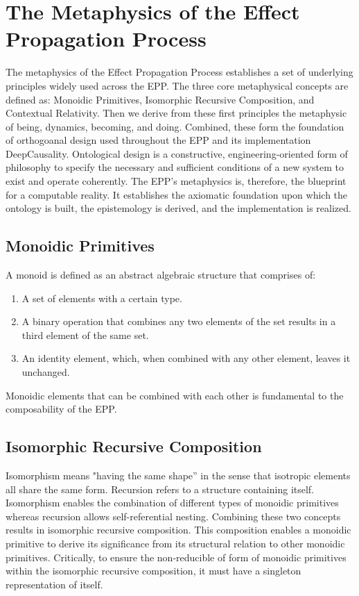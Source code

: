 \section{The Metaphysics of the Effect Propagation Process}
\label{sec:metaphysics}

The metaphysics of the Effect Propagation Process establishes a set of underlying principles widely used across the EPP. The three core metaphysical concepts are defined as: Monoidic Primitives, Isomorphic Recursive Composition, and Contextual Relativity. Then we derive from these first principles the metaphysic of being, dynamics, becoming, and doing. Combined, these form the foundation of orthogoanal design used throughout the EPP and its implementation DeepCausality. Ontological design is a constructive, engineering-oriented form of philosophy to specify the necessary and sufficient conditions of a new system to exist and operate coherently. The EPP's metaphysics is, therefore, the blueprint for a computable reality. It establishes the axiomatic foundation upon which the ontology is built, the epistemology is derived, and the implementation is realized. 

\subsection{Monoidic Primitives} 
\label{sec:metaphysics_monoidic_primitives}

A monoid is defined as an abstract algebraic structure that comprises of:

\begin{enumerate}
	\item A set of elements with a certain type.
	\item A binary operation that combines any two elements of the set results in a third element of the same set.
	\item An identity element, which, when combined with any other element, leaves it unchanged.
\end{enumerate}

  Monoidic elements that can be combined with each other is fundamental to the composability of the EPP.
  
\subsection{Isomorphic Recursive Composition} 
\label{sec:metaphysics_isomorphic_recursive_composition}


Isomorphism means "having the same shape” in the sense that isotropic elements all share the same form. Recursion refers to a structure containing itself. Isomorphism enables the combination of different types of monoidic primitives whereas recursion allows self-referential nesting. Combining these two concepts results in isomorphic recursive composition. This composition enables a monoidic primitive to derive its significance from its structural relation to other monoidic primitives. Critically, to ensure the  non-reducible  of form of monoidic primitives within the isomorphic recursive composition, it  must have a singleton representation of itself. 

